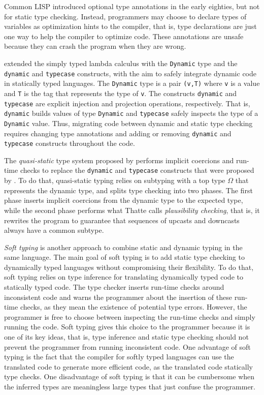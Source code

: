 \documentclass[preprint]{sig-alternate}
\begin{document}
Common LISP \citep{steele1982ocl} introduced optional type annotations
in the early eighties, but not for static type checking.
Instead, programmers may choose to declare types of variables as
optimization hints to the compiler, that is, type declarations are
just one way to help the compiler to optimize code.
These annotations are unsafe because they can crash the program
when they are wrong.

\citet{abadi1989dts} extended the simply typed lambda calculus with the
\texttt{Dynamic} type and the \texttt{dynamic} and \texttt{typecase}
constructs, with the aim to safely integrate dynamic code in
statically typed languages.
The \texttt{Dynamic} type is a pair \texttt{(v,T)} where \texttt{v} is a
value and \texttt{T} is the tag that represents the type of \texttt{v}.
The constructs \texttt{dynamic} and \texttt{typecase} are explicit
injection and projection operations, respectively.
That is, \texttt{dynamic} builds values of type \texttt{Dynamic} and
\texttt{typecase} safely inspects the type of a \texttt{Dynamic} value.
Thus, migrating code between dynamic and static type checking requires
changing type annotations and adding or removing \texttt{dynamic} and
\texttt{typecase} constructs throughout the code.

The \textit{quasi-static} type system proposed by \citet{thatte1990qst}
performs implicit coercions and run-time checks to replace the
\texttt{dynamic} and \texttt{typecase} constructs that were proposed by
\citet{abadi1989dts}.
To do that, quasi-static typing relies on subtyping with a top type
$\Omega$ that represents the dynamic type, and splits type checking
into two phases.
The first phase inserts implicit coercions from the dynamic type to
the expected type, while the second phase performs what Thatte calls
\textit{plausibility checking}, that is, it rewrites the program to
guarantee that sequences of upcasts and downcasts always have a
common subtype.

\textit{Soft typing} \citep{cartwright1991soft} is another approach
to combine static and dynamic typing in the same language.
The main goal of soft typing is to add static type checking to
dynamically typed languages without compromising their flexibility.
To do that, soft typing relies on type inference for
translating dynamically typed code to statically typed code.
The type checker inserts run-time checks around inconsistent code and
warns the programmer about the insertion of these run-time checks,
as they mean the existence of potential type errors.
However, the programmer is free to choose between inspecting the
run-time checks and simply running the code.
Soft typing gives this choice to the programmer because it is one of
its key ideas, that is, type inference and static type checking should
not prevent the programmer from running inconsistent code.
One advantage of soft typing is the fact that the compiler for
softly typed languages can use the translated code to generate
more efficient code, as the translated code statically type checks.
One disadvantage of soft typing is that it can be cumbersome when
the inferred types are meaningless large types that just confuse the
programmer.
\end{document}
